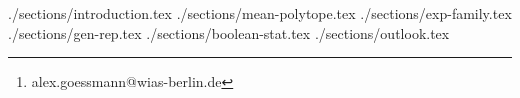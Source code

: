 \documentclass[a4paper,11pt,english]{article}
\begin{document}
    \title{\mytitle{}}
    \author{Alex Goessmann\footnote{alex.goessmann@wias-berlin.de}}
    \author{Martin Eigel}

    \maketitle

    \begin{abstract}
        
    \end{abstract}

    {./sections/introduction.tex}
    {./sections/mean-polytope.tex}
    {./sections/exp-family.tex}
    {./sections/gen-rep.tex}
    {./sections/boolean-stat.tex}
    {./sections/outlook.tex}

    \vskip 0.2in
    
    

    \appendix
\end{document}
